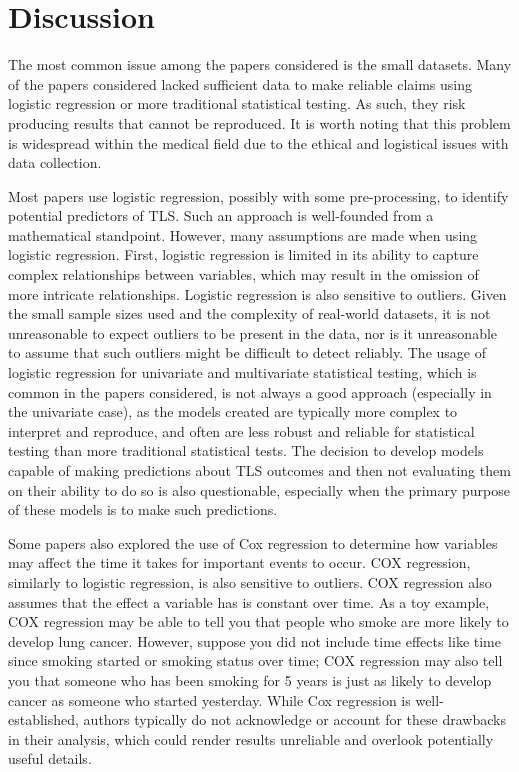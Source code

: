 \documentclass{article}
\begin{document}
\section{Discussion}

The most common issue among the papers considered is the small datasets. Many of the papers considered lacked sufficient data to make reliable claims using logistic regression or more traditional statistical testing. As such, they risk producing results that cannot be reproduced. It is worth noting that this problem is widespread within the medical field due to the ethical and logistical issues with data collection.

Most papers use logistic regression, possibly with some pre-processing, to identify potential predictors of TLS. Such an approach is well-founded from a mathematical standpoint. However, many assumptions are made when using logistic regression. First, logistic regression is limited in its ability to capture complex relationships between variables, which may result in the omission of more intricate relationships. Logistic regression is also sensitive to outliers. Given the small sample sizes used and the complexity of real-world datasets, it is not unreasonable to expect outliers to be present in the data, nor is it unreasonable to assume that such outliers might be difficult to detect reliably. The usage of logistic regression for univariate and multivariate statistical testing, which is common in the papers considered, is not always a good approach (especially in the univariate case), as the models created are typically more complex to interpret and reproduce, and often are less robust and reliable for statistical testing than more traditional statistical tests. The decision to develop models capable of making predictions about TLS outcomes and then not evaluating them on their ability to do so is also questionable, especially when the primary purpose of these models is to make such predictions.

Some papers also explored the use of Cox regression to determine how variables may affect the time it takes for important events to occur. COX regression, similarly to logistic regression, is also sensitive to outliers. COX regression also assumes that the effect a variable has is constant over time. As a toy example, COX regression may be able to tell you that people who smoke are more likely to develop lung cancer. However, suppose you did not include time effects like time since smoking started or smoking status over time; COX regression may also tell you that someone who has been smoking for 5 years is just as likely to develop cancer as someone who started yesterday. While Cox regression is well-established, authors typically do not acknowledge or account for these drawbacks in their analysis, which could render results unreliable and overlook potentially useful details.
\end{document}
